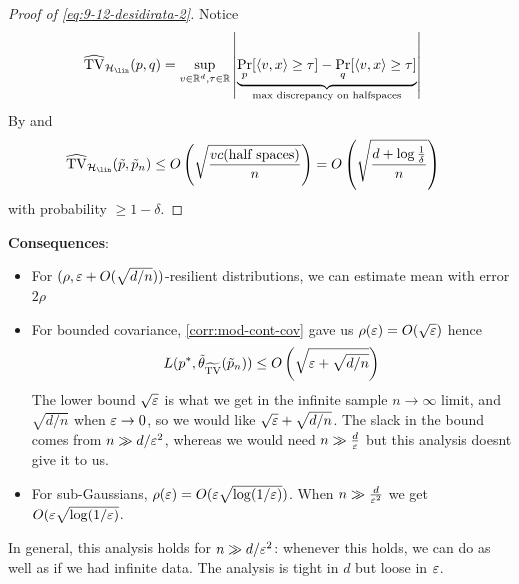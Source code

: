 \begin{proof}[Proof of \cref{eq:9-12-desidirata-2}]
    Notice
    \begin{align}
        \widehat{\TV}_{\cH_{\lin}}(p,q)
        &= \sup_{v \in \RR^d, \tau \in \RR} \left\lvert
            \underbrace{\Pr_p[\braket{v,x} \geq \tau] - \Pr_q[\braket{v,x} \geq \tau]}_{\text{max discrepancy on halfspaces}}
        \right\rvert
    \end{align}
    By  and 
    \begin{align}
        \widehat{\TV}_{\cH_{\lin}}(\tilde{p}, \tilde{p}_n)
        &\leq O\left(\sqrt{\frac{vc(\text{half spaces})}{n}}\right)
        = O\left(\sqrt{\frac{d + \log \frac{1}{\delta}}{n}}\right)
    \end{align}
    with probability $\geq 1 - \delta$.
\end{proof}

\textbf{Consequences}:
\begin{itemize}
    \item For $(\rho, \varepsilon + O(\sqrt{d/n}))$-resilient distributions, we can estimate mean with error $2 \rho$
    \item For bounded covariance, \cref{corr:mod-cont-cov} gave us
        $\rho(\varepsilon) = O(\sqrt{\varepsilon})$ hence
    \begin{align}
        L(p^*, \tilde{\theta}_{\widetilde{\operatorname{TV}}}(\tilde{p}_n)) 
        \leq O\left(\sqrt{\varepsilon + \sqrt{d/n}}\right)
    \end{align}
    The lower bound $\sqrt{\varepsilon}$ is what we get in the infinite sample $n \to \infty$
    limit, and $\sqrt{d/n}$ when $\varepsilon \to 0$, so we would like $\sqrt{\varepsilon} + \sqrt{d/n}$.
    The slack in the bound comes from $n \gg d / \varepsilon^2$, whereas we would need $n \gg \frac{d}{\varepsilon}$ but this analysis doesnt give it to us.

    \item For sub-Gaussians, $\rho(\varepsilon) = O(\varepsilon \sqrt{\log(1/\varepsilon)})$.
    When $n \gg \frac{d}{\varepsilon^2}$ we get $O(\varepsilon \sqrt{\log (1/\varepsilon)}$.
\end{itemize}
In general, this analysis holds for $n \gg d / \varepsilon^2$: whenever this holds, we can
do as well as if we had infinite data. The analysis is tight in $d$ but loose in $\varepsilon$.

